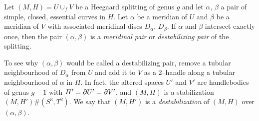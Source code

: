 \begin{defn}	
	Let $(M,H)=U\cup_f V$ be a Heegaard splitting of genus $g$ and let $\alpha$, $\beta$ a pair of simple, closed, essential curves in $H$.
	Let $\alpha$ be a meridian of $U$ and $\beta$ be a meridian of $V$ with associated meridinal discs $D_\alpha$, $D_\beta$.
	If $\alpha$ and $\beta$ intersect exactly once, then the pair $(\alpha,\beta)$ is a \emph{meridinal pair} or \emph{destabilizing pair} of the splitting.
\end{defn}

To see why $(\alpha,\beta)$ would be called a destabilizing pair, remove a tubular neighbourhood of $D_\alpha$ from $U$ and add it to $V$ as a 2--handle along a tubular neighbourhood of $\alpha$ in $H$.
In fact, the altered spaces $U'$ and $V'$ are handlebodies of genus $g-1$ with $H'= \partial U' = \partial V'$, and $(M,H)$ is a stabilization $(M,H')\#(S^3,T^2)$.
We say that $(M,H')$ is a \emph{destabilization} of $(M,H)$ over $(\alpha,\beta)$.

%
